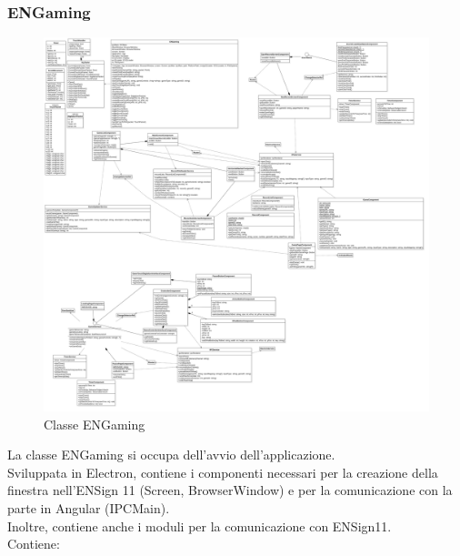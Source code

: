 \subsubsection{ENGaming}
\begin{figure}[h]
    \centering
    \includegraphics[width=340pt]{images/prog/ENGaming.png}
    \caption{Classe ENGaming}
    \label{fig:engaming}
\end{figure}
La classe ENGaming si occupa dell'avvio dell'applicazione.\\ Sviluppata in Electron, contiene i componenti necessari per la creazione della finestra nell'ENSign 11 (Screen, BrowserWindow) e per la comunicazione con la parte in Angular (IPCMain).\\
Inoltre, contiene anche i moduli per la comunicazione con ENSign11.\\
Contiene:
